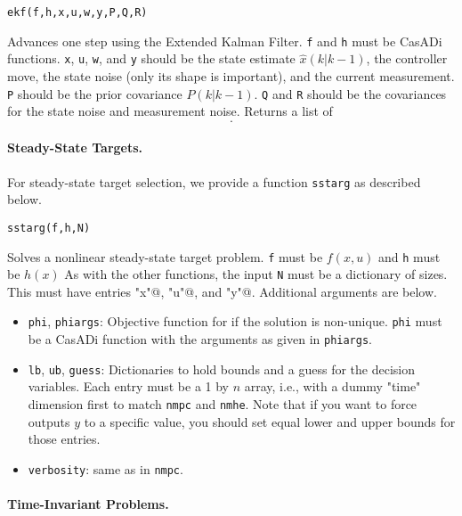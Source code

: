 \documentclass{article}
\newcommand{\funcname}[2][.25em]{\vspace{#1}\noindent\texttt{#2}\nopagebreak\vspace{#1}}
\newcommand{\casadi}{CasADi}
\begin{document}
\begin{multicols}{2}
\funcname{ekf(f,h,x,u,w,y,P,Q,R)}

Advances one step using the Extended Kalman Filter.
\texttt{f} and \texttt{h} must be \casadi{} functions.
\texttt{x}, \texttt{u}, \texttt{w}, and \texttt{y} should be the state estimate $\hat{x}(k|k-1)$, the controller move, the state noise (only its shape is important), and the current measurement.
\texttt{P} should be the prior covariance $P(k|k-1)$.
\texttt{Q} and \texttt{R} should be the covariances for the state noise and measurement noise.
Returns a list of
%
\begin{equation*}
    [P(k+1|k), \; \hat{x}(k+1|k), \; P(k|k), \; \hat{x}(k|k)].
\end{equation*}

\paragraph*{Steady-State Targets.}

For steady-state target selection, we provide a function \texttt{sstarg} as described below.

\funcname{sstarg(f,h,N)}

Solves a nonlinear steady-state target problem.
\texttt{f} must be $f(x,u)$ and \texttt{h} must be $h(x)$
As with the other functions, the input \texttt{N} must be a dictionary of sizes.
This must have entries \lstinline@"x"@, \lstinline@"u"@, and \lstinline@"y"@.
Additional arguments are below.

\begin{itemize}[noitemsep,nolistsep]
    \item \texttt{phi}, \texttt{phiargs}: Objective function for if the solution is non-unique.
    \texttt{phi} must be a \casadi{} function with the arguments as given in \texttt{phiargs}.
    \item \texttt{lb}, \texttt{ub}, \texttt{guess}: Dictionaries to hold bounds and a guess for the decision variables.
    Each entry must be a 1 by $n$ array, i.e., with a dummy "time" dimension first to match \texttt{nmpc} and \texttt{nmhe}.
    Note that if you want to force outputs $y$ to a specific value, you should set equal lower and upper bounds for those entries.
    \item \texttt{verbosity}: same as in \texttt{nmpc}.
\end{itemize}

\paragraph*{Time-Invariant Problems.}


\end{multicols}
\end{document}
